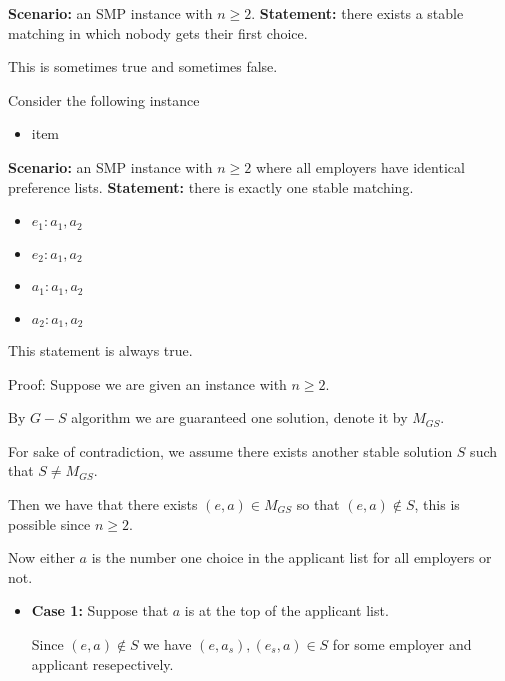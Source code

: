 \begin{questions}
	\question[4] \textbf{Scenario:} an SMP instance with $n \ge 2$. \textbf{Statement:} there exists a stable matching in which nobody gets their first choice.

	\begin{soln}
		This is sometimes true and sometimes false.

		Consider the following instance
		\begin{itemize}
			\item item
		\end{itemize}


	\end{soln}
	\ifsolutions\fi

	\question[4] \textbf{Scenario:} an SMP instance with $n \ge 2$ where all employers have identical preference lists. \textbf{Statement:} there is exactly one stable matching.
	\begin{itemize}
		\item	\(e_1 : a_1, a_2\)
		\item \(e_2 : a_1, a_2\)
		\item \(a_1 : a_1, a_2\)
		\item \(a_2 : a_1, a_2\)
	\end{itemize}

	\ifsolutions\fi

	\begin{soln}

		This statement is always true.

		Proof: Suppose we are given an instance with \(n \geq 2\).

		By \(G-S\) algorithm we are guaranteed one solution, denote it by \(M_{GS}\).

		For sake of contradiction, we assume there exists another stable solution \(S\) such that \(S \neq M_{GS}\).

		Then we have that there exists \((e, a) \in M_{GS}\) so that \((e, a) \notin S\), this is possible since \(n \geq 2\).

		Now either \(a\) is the number one choice in the applicant list for all employers or not.

		\begin{itemize}
			\item \textbf{Case 1:} Suppose that \(a\) is at the top of the applicant list.

			      Since \((e, a) \notin S\) we have \((e, a_s), (e_s, a) \in S\) for some employer and applicant resepectively.


\end{itemize}
\end{soln}
\end{questions}

